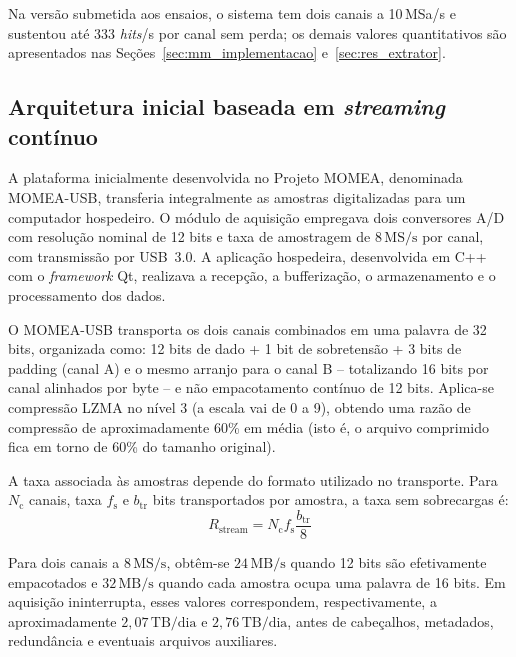 Na versão submetida aos ensaios, o sistema tem dois canais a 10\,MSa/s e sustentou até 333 \textit{hits}/s por canal sem perda; os demais valores quantitativos são apresentados nas Seções~\ref{sec:mm_implementacao} e~\ref{sec:res_extrator}. 
\subsection{Arquitetura inicial baseada em \textit{streaming} contínuo}
\label{v2:subsec:streaming_continuo}

A plataforma inicialmente desenvolvida no Projeto MOMEA, denominada MOMEA-USB, transferia integralmente as amostras digitalizadas para um computador hospedeiro. O módulo de aquisição empregava dois conversores A/D com resolução nominal de 12 bits e taxa de amostragem de \(8\,\mathrm{MS/s}\) por canal, com transmissão por USB~3.0. A aplicação hospedeira, desenvolvida em C++ com o \textit{framework} Qt, realizava a recepção, a bufferização, o armazenamento e o processamento dos dados. 

O MOMEA-USB transporta os dois canais combinados em uma palavra de 32 bits, organizada como: 12 bits de dado + 1 bit de sobretensão + 3 bits de padding (canal A) e o mesmo arranjo para o canal B -- totalizando 16 bits por canal alinhados por byte -- e não empacotamento contínuo de 12 bits. Aplica-se compressão LZMA no nível 3 (a escala vai de 0 a 9), obtendo uma razão de compressão de aproximadamente 60\% em média (isto é, o arquivo comprimido fica em torno de 60\% do tamanho original).

A taxa associada às amostras depende do formato utilizado no transporte. Para \(N_{\mathrm{c}}\) canais, taxa \(f_{\mathrm{s}}\) e \(b_{\mathrm{tr}}\) bits transportados por amostra, a taxa sem sobrecargas é:
\begin{equation}
	R_{\mathrm{stream}} = N_{\mathrm{c}}f_{\mathrm{s}} \frac{b_{\mathrm{tr}}}{8}
	\label{v2:eq:taxa_streaming_secao3}
\end{equation}

Para dois canais a \(8\,\mathrm{MS/s}\), obtêm-se \(24\,\mathrm{MB/s}\) quando 12 bits são efetivamente empacotados e \(32\,\mathrm{MB/s}\) quando cada amostra ocupa uma palavra de 16 bits. Em aquisição ininterrupta, esses valores correspondem, respectivamente, a aproximadamente \(2{,}07\,\mathrm{TB/dia}\) e \(2{,}76\,\mathrm{TB/dia}\), antes de cabeçalhos, metadados, redundância e eventuais arquivos auxiliares.

